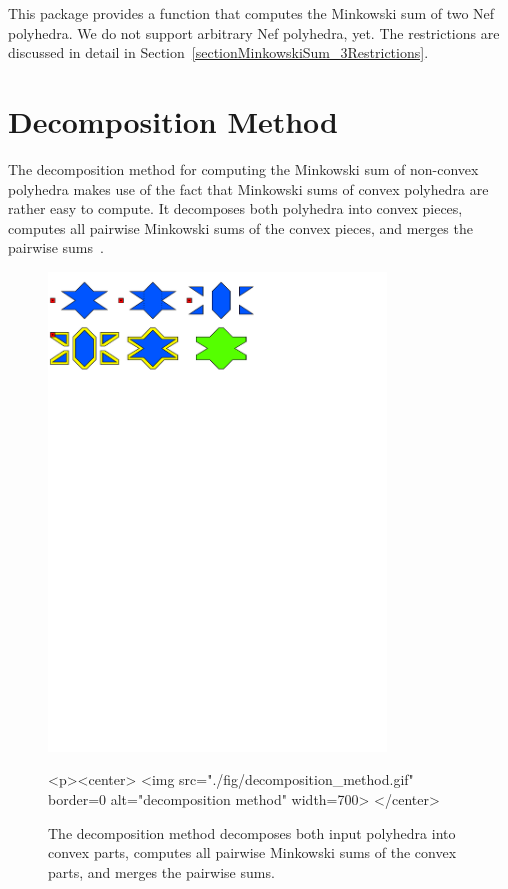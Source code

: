 This package provides a function  that computes
the Minkowski sum of two Nef polyhedra. We do not support arbitrary
Nef polyhedra, yet. The restrictions are discussed in detail in
Section~\ref{sectionMinkowskiSum_3Restrictions}.

\section{Decomposition Method}

The decomposition method for computing the Minkowski sum of non-convex
polyhedra makes use of the fact that Minkowski sums of convex
polyhedra are rather easy to compute. It decomposes both polyhedra
into convex pieces, computes all pairwise Minkowski sums of the convex
pieces, and merges the pairwise sums~\cite{bkos-cgaa-97}.

\begin{figure}[t]
  \begin{ccTexOnly}
    \begin{center}
      \includegraphics[width=0.8\textwidth]{Minkowski_sum_3/fig/decomposition_method}
    \end{center}
  \end{ccTexOnly}
  \begin{ccHtmlOnly}
    <p><center>
    <img src="./fig/decomposition_method.gif" border=0
    alt="decomposition method" width=700>
    </center>
  \end{ccHtmlOnly}
  \caption{The decomposition method decomposes both input polyhedra
           into convex parts, computes all pairwise Minkowski sums
           of the convex parts, and merges the pairwise sums.}
\end{figure}

